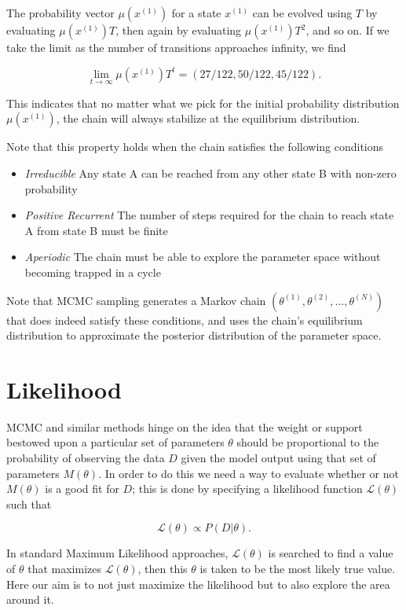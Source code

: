     The probability vector $\mu(x^{(1)})$ for a state $x^{(1)}$ can be evolved using $T$ by evaluating $\mu(x^{(1)})T$, then again by evaluating $\mu(x^{(1)})T^2$, and so on. If we take the limit as the number of transitions approaches infinity, we find

    $$
        \lim_{t \to \infty} \mu(x^{(1)})T^t = (27/122, 50/122, 45/122).
    $$

    This indicates that no matter what we pick for the initial probability distribution $\mu(x^{(1)})$, the chain will always stabilize at the equilibrium distribution.

    Note that this property holds when the chain satisfies the following conditions

    \begin{itemize}
        \item \textit{Irreducible} Any state A can be reached from any other state B with non-zero probability
        \item \textit{Positive Recurrent} The number of steps required for the chain to reach state A from state B must be finite
        \item \textit{Aperiodic} The chain must be able to explore the parameter space without becoming trapped in a cycle
    \end{itemize}

    Note that MCMC sampling generates a Markov chain $(\theta^{(1)}, \theta^{(2)},..., \theta^{(N)})$ that does indeed satisfy these conditions, and uses the chain's equilibrium distribution to approximate the posterior distribution of the parameter space.    


\section{Likelihood}

    MCMC and similar methods hinge on the idea that the weight or support bestowed upon a particular set of parameters $\theta$ should be proportional to the probability of observing the data $D$ given the model output using that set of parameters $M(\theta)$. In order to do this we need a way to evaluate whether or not $M(\theta)$ is a good fit for $D$; this is done by specifying a likelihood function $\mathcal{L}(\theta)$ such that

    $$
        \mathcal{L}(\theta) \propto P(D|\theta).
    $$

    In standard Maximum Likelihood approaches, $\mathcal{L}(\theta)$ is searched to find a value of $\theta$ that maximizes $\mathcal{L}(\theta)$, then this $\theta$ is taken to be the most likely true value. Here our aim is to not just maximize the likelihood but to also explore the area around it.


